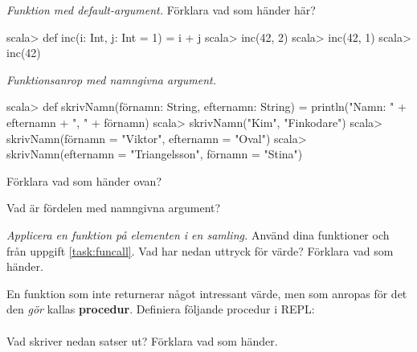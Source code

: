 \Subtask {}

\Subtask {}

\Subtask {}

\Subtask {}

\Task \emph{Funktion med default-argument.} Förklara vad som händer här?
\begin{REPL}
scala> def inc(i: Int, j: Int = 1) = i + j
scala> inc(42, 2)
scala> inc(42, 1)
scala> inc(42)
\end{REPL}

\Task \emph{Funktionsanrop med namngivna argument.}
\begin{REPL}
scala> def skrivNamn(förnamn: String, efternamn: String) =
         println("Namn: " + efternamn + ", " + förnamn)
scala> skrivNamn("Kim", "Finkodare")
scala> skrivNamn(förnamn = "Viktor", efternamn = "Oval")
scala> skrivNamn(efternamn = "Triangelsson", förnamn = "Stina")
\end{REPL}

\Subtask Förklara vad som händer ovan?

\Subtask\Pen Vad är fördelen med namngivna argument?



\Task \emph{Applicera en funktion på elementen i en samling.} Använd dina funktioner  och  från uppgift \ref{task:funcall}. Vad har nedan uttryck för värde? Förklara vad som händer.

\Subtask {}

\Subtask {}

\Subtask {}

\Subtask {}

\Subtask {}

\Subtask {}

\Subtask {}

\Subtask {}



\Task En funktion som inte returnerar något intressant värde, men som anropas för det den \emph{gör} kallas \textbf{procedur}. Definiera följande procedur i REPL: \\
 \\
Vad skriver nedan satser ut? Förklara vad som händer.

